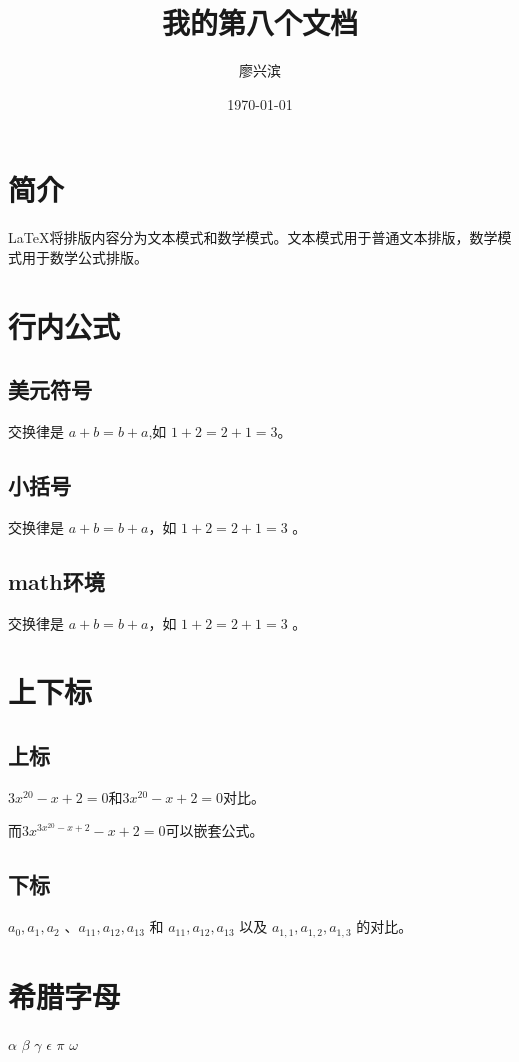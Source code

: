 \documentclass{article} %
\title{\heiti 我的第八个文档}
\author{\kaishu 廖兴滨}
\date{\today}
\begin{document}
	\section{简介}
	\LaTeX{}将排版内容分为文本模式和数学模式。文本模式用于普通文本排版，数学模式用于数学公式排版。
	
	\section{行内公式}
	\subsection{美元符号}
	交换律是 $ a + b = b + a $,如 $ 1 + 2 = 2 + 1 = 3 $。
	
	\subsection{小括号}
	交换律是 \( a + b = b + a \)，如 \( 1 + 2 = 2 + 1 = 3 \) 。
	
	\subsection{math环境}
	交换律是 \begin{math} a + b = b + a \end{math}，如 \begin{math} 1 + 2 = 2 + 1 = 3 \end{math} 。
	
	\section{上下标}
	\subsection{上标}
	$ 3x^{20} - x + 2 = 0 $和$ 3x^20 - x + 2 = 0 $对比。
	
	而$ 3x^{3x^{20} - x + 2} - x + 2 = 0 $可以嵌套公式。
	
	\subsection{下标}
	$ a_0,a_1,a_2 $ 、$ a_11,a_12,a_13 $ 和 $ a_{11},a_{12},a_{13} $ 以及 $ a_{1,1},a_{1,2},a_{1,3} $ 的对比。
	
	\section{希腊字母}
	$ \alpha $ $ \beta $ $ \gamma $ $ \epsilon $  $ \pi $   $ \omega $
	
\end{document}
